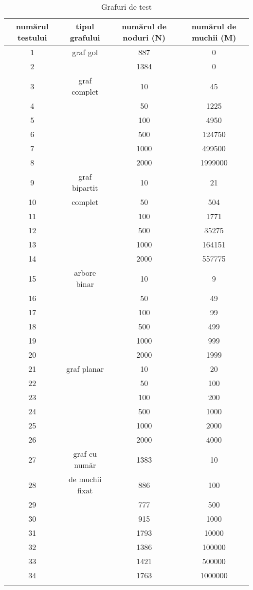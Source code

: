 \documentclass[runningheads]{paper}
\begin{document}
\begin{longtable}{@{}|c|c|c|c|@{}}
    \hline\hline
    numărul testului & tipul grafului  & numărul de noduri (N)  & numărul de muchii (M) \\
    \hline
    1 & graf gol  & 887  & 0 \\
    2 &  & 1384 & 0 \\ \hline
    3 & graf complet & 10 & 45 \\
    4 &  & 50 & 1225 \\
    5 &  & 100 & 4950 \\
    6 &  & 500 & 124750 \\
    7 &  & 1000 & 499500 \\
    8 &  & 2000 & 1999000 \\ \hline
    9 & graf bipartit & 10 & 21 \\
    10 & complet & 50 & 504 \\
    11 &  & 100 & 1771 \\
    12 &  & 500 & 35275 \\
    13 &  & 1000 & 164151 \\
    14 &  & 2000 & 557775 \\ \hline
    15 & arbore binar & 10 & 9 \\
    16 &  & 50 & 49 \\
    17 &  & 100 & 99 \\
    18 &  & 500 & 499 \\
    19 &  & 1000 & 999 \\
    20 &  & 2000 & 1999 \\ \hline
    21 & graf planar & 10 & 20 \\
    22 &  & 50 & 100 \\
    23 &  & 100 & 200 \\
    24 &  & 500 & 1000 \\
    25 &  & 1000 & 2000\\
    26 &  & 2000 & 4000 \\ \hline
    27 & graf cu număr & 1383 & 10 \\
    28 & de muchii fixat & 886 & 100 \\
    29 &  & 777 & 500 \\
    30 &  & 915 & 1000 \\
    31 &  & 1793 & 10000 \\
    32 &  & 1386 & 100000 \\
    33 &  & 1421 & 500000 \\
    34 &  & 1763 & 1000000 \\
    \hline
    \caption{Grafuri de test}
    \label{tab1}
    \end{longtable}
\end{document}
